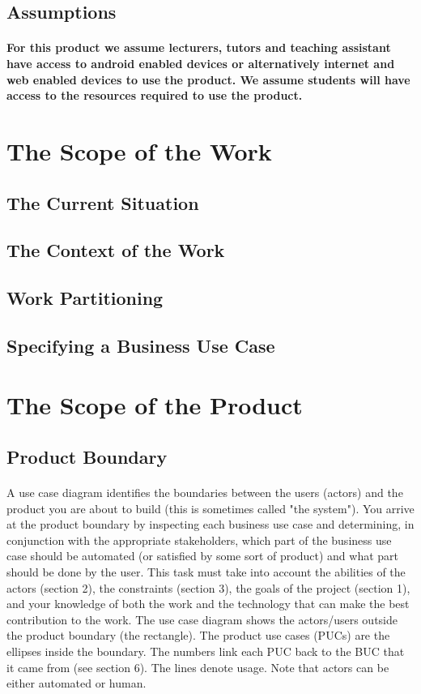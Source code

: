\documentclass[12pt,a4paper]{article}
\begin{document}
\subsection{Assumptions}
\paragraph{For this product we assume lecturers, tutors and teaching assistant have access to android enabled devices or alternatively internet and web enabled devices to use the product.
We assume students will have access to the resources required to use the product.
}
\pagebreak
\section{The Scope of the Work}
\subsection{The Current Situation}
\subsection{The Context of the Work}
\subsection{Work Partitioning}
\subsection{Specifying a Business Use Case}
\pagebreak
\section{The Scope of the Product}
\subsection{Product Boundary}
\paragraph{}
A use case diagram identifies the boundaries between the users (actors) and the product you are about to build (this is sometimes called "the system"). You arrive at the product boundary by inspecting each business use case and determining, in conjunction with the appropriate stakeholders, which part of the business use case should be automated (or satisfied by some sort of product) and what part should be done by the user. This task must take into account the abilities of the actors (section 2), the constraints (section 3), the goals of the project (section 1), and your knowledge of both the work and the technology that can make the best contribution to the work.
The use case diagram shows the actors/users outside the product boundary (the rectangle). The product use cases (PUCs) are the ellipses inside the boundary. The numbers link each PUC back to the BUC that it came from (see section 6). The lines denote usage. Note that actors can be either automated or human.
\end{document}
